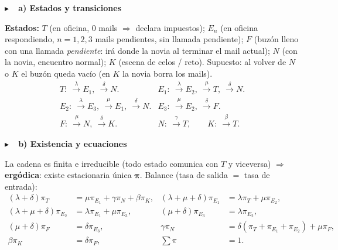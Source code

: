 \documentclass[11pt,a4paper]{article}
\newcommand{\paso}[1]{%
  \par\addvspace{9pt}\needspace{2.4cm}\noindent
  {\sffamily\bfseries\color{primary}$\blacktriangleright$\ \ #1}\par\nobreak
  \vspace{2pt}\noindent{\color{primary!22}\rule{\linewidth}{0.8pt}}\par\nobreak\vspace{5pt}%
}
\begin{document}
\paso{a) Estados y transiciones}
\textbf{Estados:} $T$ (en oficina, $0$ mails $\Rightarrow$ declara impuestos); $E_n$ (en oficina
respondiendo, $n=1,2,3$ mails pendientes, sin llamada pendiente); $F$ (buzón lleno con una
llamada \emph{pendiente}: irá donde la novia al terminar el mail actual); $N$ (con la novia,
encuentro normal); $K$ (escena de celos / reto). Supuesto: al volver de $N$ o $K$ el buzón
queda vacío (en $K$ la novia borra los mails).
\[
\begin{array}{ll}
T:\ \xrightarrow{\lambda}E_1,\ \xrightarrow{\delta}N. &
E_1:\ \xrightarrow{\lambda}E_2,\ \xrightarrow{\mu}T,\ \xrightarrow{\delta}N.\\[2pt]
E_2:\ \xrightarrow{\lambda}E_3,\ \xrightarrow{\mu}E_1,\ \xrightarrow{\delta}N. &
E_3:\ \xrightarrow{\mu}E_2,\ \xrightarrow{\delta}F.\\[2pt]
F:\ \xrightarrow{\mu}N,\ \xrightarrow{\delta}K. &
N:\ \xrightarrow{\gamma}T,\qquad K:\ \xrightarrow{\beta}T.
\end{array}
\]
\begin{center}
\end{center}

\paso{b) Existencia y ecuaciones}
La cadena es finita e irreducible (todo estado comunica con $T$ y viceversa) $\Rightarrow$
\textbf{ergódica}: existe estacionaria única $\boldsymbol\pi$. Balance (tasa de salida $=$ tasa de
entrada):
\[
\begin{aligned}
(\lambda+\delta)\pi_T&=\mu\pi_{E_1}+\gamma\pi_N+\beta\pi_K, &
(\lambda+\mu+\delta)\pi_{E_1}&=\lambda\pi_T+\mu\pi_{E_2},\\
(\lambda+\mu+\delta)\pi_{E_2}&=\lambda\pi_{E_1}+\mu\pi_{E_3}, &
(\mu+\delta)\pi_{E_3}&=\lambda\pi_{E_2},\\
(\mu+\delta)\pi_F&=\delta\pi_{E_3}, &
\gamma\pi_N&=\delta(\pi_T+\pi_{E_1}+\pi_{E_2})+\mu\pi_F,\\
\beta\pi_K&=\delta\pi_F, & \textstyle\sum\pi&=1.
\end{aligned}
\]
\end{document}
